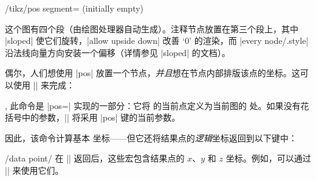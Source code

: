 {\begin{key}{/tikz/pos segment= (initially empty)}
\pgfplotsexpensiveexample
\begin{codeexample}[]
\end{codeexample}
    这个图有四个段（由绘图处理器自动生成）。注释节点放置在第三个段上，其中 |sloped| 使它们旋转，|allow upside down| 改善 `$0$' 的渲染，而 |every node/.style| 沿法线向量方向安装一个偏移（详情参见 |sloped| 的文档）。
\end{key}

偶尔，人们想使用 |pos| 放置一个节点，\emph{并且}想在节点内部排版该点的坐标。这可以使用 |\pgfplotspointplotattime| 来完成：

\begin{commandlist}{\pgfplotspointplotattime,\pgfplotspointplotattime{}}
    此命令是 |pos=| 实现的一部分：它将 \pgfname{} 的当前点定义为当前图的  处。如果没有花括号中的参数，|\pgfplotspointplotattime| 将采用 |pos| 键的当前参数。

    因此，该命令计算基本 \pgfname{} 坐标——但它还将结果点的\emph{逻辑}坐标返回到以下键中：

    \begin{pgfplotsxykeylist}{/data point/\x}
        在 |\pgfplotspointplotattime| 返回后，这些宏包含结果点的 $x$、$y$ 和 $z$ 坐标。例如，可以通过 || 来使用它们。
\begin{codeexample}[]
\end{codeexample}


\end{pgfplotsxykeylist}
\end{commandlist}}
